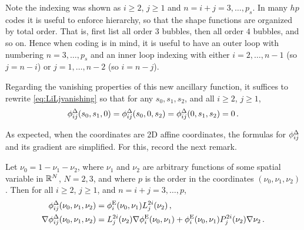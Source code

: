Note the indexing was shown as $i\geq2$, $j\geq1$ and $n=i+j=3,\ldots,p_s$. 
In many $hp$ codes it is useful to enforce hierarchy, so that the shape functions are organized by total order. 
That is, first list all order $3$ bubbles, then all order $4$ bubbles, and so on.
Hence when coding is in mind, it is useful to have an outer loop with numbering $n=3,\ldots,p_s$ and an inner loop indexing with either $i=2,\ldots,n-1$ (so $j=n-i$) or $j=1,\ldots,n-2$ (so $i=n-j$).

Regarding the vanishing properties of this new ancillary function, it suffices to rewrite \eqref{eq:LiLjvanishing} so that for any $s_0,s_1,s_2$, and all $i\geq2$, $j\geq1$,
\begin{equation}
	\phi_{ij}^\Delta(s_0,s_1,0)=\phi_{ij}^\Delta(s_0,0,s_2)=\phi_{ij}^\Delta(0,s_1,s_2)=0\,.\label{eq:phiTrivanishing}
\end{equation}

As expected, when the coordinates are 2D affine coordinates, the formulas for $\phi_{ij}^\Delta$ and its gradient are simplified.
For this, record the next remark.

\begin{remark}
Let $\nu_0=1-\nu_1-\nu_2$, where $\nu_1$ and $\nu_2$ are arbitrary functions of some spatial variable in $\mathbb{R}^N$, $N=2,3$, and where $p$ is the order in the coordinates $(\nu_0,\nu_1,\nu_2)$. Then for all $i\geq2$, $j\geq1$, and $n=i+j=3,\ldots,p$,
\begin{equation}
	\begin{aligned}
    \phi_{ij}^\Delta(\nu_0,\nu_1,\nu_2)&=\phi_i^{\mathrm{E}}(\nu_0,\nu_1)L_j^{2i}(\nu_2)\,,\\
    \nabla\phi_{ij}^\Delta(\nu_0,\nu_1,\nu_2)&=L_j^{2i}(\nu_2)\nabla\phi_i^{\mathrm{E}}(\nu_0,\nu_1)
    	+\phi_i^{\mathrm{E}}(\nu_0,\nu_1)P_{j}^{2i}(\nu_2)\nabla\nu_2\,.
	\end{aligned}
  \label{eq:H1Trispecialcase}
\end{equation}
\end{remark}


